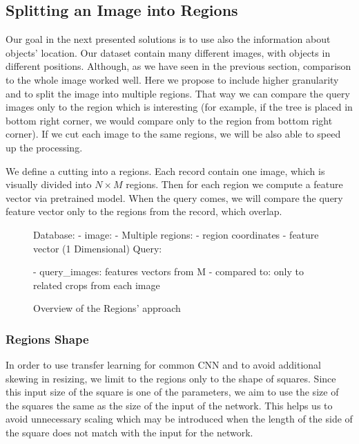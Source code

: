 \subsection{Splitting an Image into Regions}

Our goal in the next presented solutions is to use also the information about objects' location. Our dataset contain many different images, with objects in different positions. Although, as we have seen in the previous section, comparison to the whole image worked well. Here we propose to include higher granularity and to split the image into multiple regions. That way we can compare the query images only to the region which is interesting (for example, if the tree is placed in bottom right corner, we would compare only to the region from bottom right corner). If we cut each image to the same regions, we will be also able to speed up the processing.

We define a cutting into a regions. Each record contain one image, which is visually divided into  $N \times M$ regions. Then for each region we compute a feature vector via pretrained model. When the query comes, we will compare the query feature vector only to the regions from the record, which overlap.

\begin{figure}
\centering
\begin{boxedverbatim}
Database:
    - image:
        - Multiple regions:
            - region coordinates
            - feature vector (1 Dimensional)
Query:


    - query_images: features vectors from M
    - compared to: only to related crops from each image
\end{boxedverbatim}
\caption{Overview of the Regions' approach}
\end{figure}



\subsubsection{Regions Shape}

In order to use transfer learning for common CNN and to avoid additional skewing in resizing, we limit to the regions only to the shape of squares. Since this input size of the square is one of the parameters, we aim to use the size of the squares the same as the size of the input of the network. This helps us to avoid unnecessary scaling which may be introduced when the length of the side of the square does not match with the input for the network.

